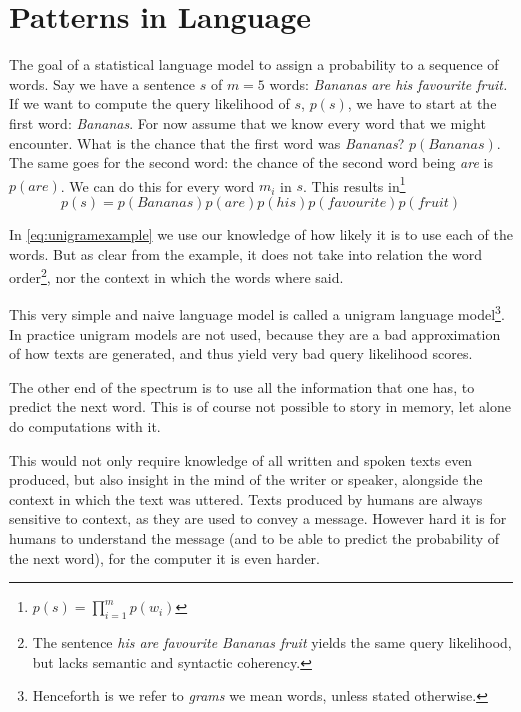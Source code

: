 
\section{Patterns in Language}
The goal of a statistical language model to assign a probability to a sequence of words. Say we have a sentence $s$ of $m=5$ words: \emph{Bananas are his favourite fruit.} If we want to compute the query likelihood of $s$, $p(s)$, we have to start 
at the first word: \emph{Bananas}. For now assume that we know every word that we might encounter. What is the chance that the first word was \emph{Bananas}? $p(\mathit{Bananas})$. The same goes for the second word: the chance of the second word being \emph{are} is $p(\mathit{are})$. We can do this for every word $m_i$ in $s$. This results in\footnote{$p(s)=\prod_{i=1}^m p(w_i)$}
\begin{equation}
p(s) = p(\mathit{Bananas})p(\mathit{are})p(\mathit{his})p(\mathit{favourite})p(\mathit{fruit})\label{eq:unigramexample}
\end{equation}

In \cref{eq:unigramexample} we use our knowledge of how likely it is to use each of the words. But as clear from the example, it does not take into relation the word order\footnote{The sentence \emph{his are favourite Bananas fruit} yields the same query likelihood, but lacks semantic and syntactic coherency.}, nor the context in which the words where said.

This very simple and naive language model is called a unigram language model\footnote{Henceforth is we refer to \emph{grams} we mean words, unless stated otherwise.}. In practice unigram models are not used, because they are a bad approximation of how texts are generated, and thus yield very bad query likelihood scores.

The other end of the spectrum is to use all the information that one has, to predict the next word. This is of course not possible to story in memory, let alone do computations with it.

This would not only require knowledge of all written and spoken texts even produced, but also insight in the mind of the writer or speaker, alongside the context in which the text was uttered. Texts produced by humans are always sensitive to context, as they are used to convey a message. However hard it is for humans to understand the message (and to be able to predict the probability of the next word), for the computer it is even harder.

